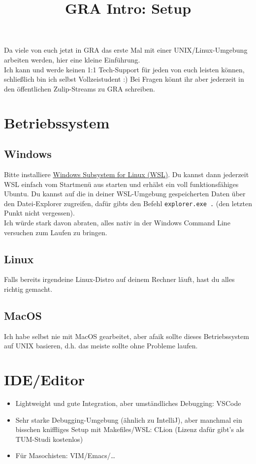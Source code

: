 \documentclass{article}
\title{\vspace{-4cm}GRA Intro: Setup}
\date{}
\author{}
\begin{document}
\maketitle
\vspace{-1.5cm}

Da viele von euch jetzt in GRA das erste Mal mit 
einer UNIX/Linux-Umgebung arbeiten werden, hier eine kleine Einführung.\\ Ich kann und werde keinen 1:1 Tech-Support für jeden von euch leisten
können, schließlich bin ich selbst Vollzeistudent :) Bei Fragen könnt ihr aber jederzeit in den öffentlichen Zulip-Streams zu 
GRA schreiben.

\section{Betriebssystem}
    \subsection{Windows}
    Bitte installiere \href{https://learn.microsoft.com/de-de/windows/wsl/install}{Windows Subsystem for Linux (WSL)}.
    Du kannst dann jederzeit WSL einfach vom Startmenü aus starten und erhälst ein voll funktionsfähiges Ubuntu.
    Du kannst auf die in deiner WSL-Umgebung gespeicherten Daten über den Datei-Explorer zugreifen, dafür gibts den Befehl
    \glqq\verb|explorer.exe .|\grqq{} (den letzten Punkt nicht vergessen).\\
    Ich würde stark davon abraten, alles nativ in der Windows Command Line versuchen zum Laufen zu bringen.
    \subsection{Linux}
    Falls bereits irgendeine Linux-Distro auf deinem Rechner läuft, hast du alles
    richtig gemacht.
    \subsection{MacOS}
    Ich habe selbst nie mit MacOS gearbeitet, aber afaik sollte dieses Betriebssystem
    auf UNIX basieren, d.h. das meiste sollte ohne Probleme laufen.
\section{IDE/Editor}
\begin{itemize}
    \item Lightweight und gute Integration, aber umständliches Debugging: VSCode
    \item Sehr starke Debugging-Umgebung (ähnlich zu IntelliJ), aber manchmal ein bisschen kniffliges Setup mit Makefiles/WSL: CLion (Lizenz dafür gibt's als TUM-Studi kostenlos)
    \item Für Masochisten: VIM/Emacs/\ldots
\end{itemize}
\end{document}
